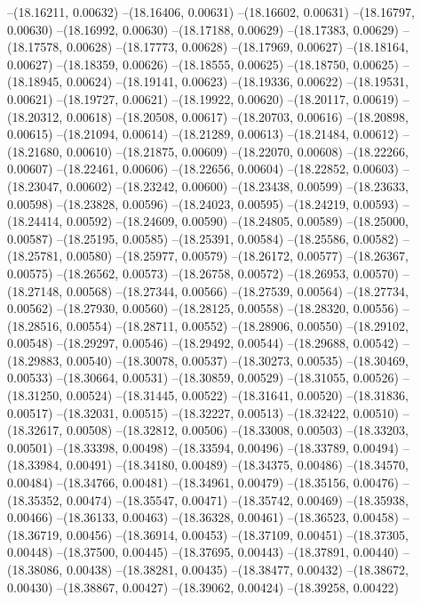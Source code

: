 --(18.16211, 0.00632)
--(18.16406, 0.00631)
--(18.16602, 0.00631)
--(18.16797, 0.00630)
--(18.16992, 0.00630)
--(18.17188, 0.00629)
--(18.17383, 0.00629)
--(18.17578, 0.00628)
--(18.17773, 0.00628)
--(18.17969, 0.00627)
--(18.18164, 0.00627)
--(18.18359, 0.00626)
--(18.18555, 0.00625)
--(18.18750, 0.00625)
--(18.18945, 0.00624)
--(18.19141, 0.00623)
--(18.19336, 0.00622)
--(18.19531, 0.00621)
--(18.19727, 0.00621)
--(18.19922, 0.00620)
--(18.20117, 0.00619)
--(18.20312, 0.00618)
--(18.20508, 0.00617)
--(18.20703, 0.00616)
--(18.20898, 0.00615)
--(18.21094, 0.00614)
--(18.21289, 0.00613)
--(18.21484, 0.00612)
--(18.21680, 0.00610)
--(18.21875, 0.00609)
--(18.22070, 0.00608)
--(18.22266, 0.00607)
--(18.22461, 0.00606)
--(18.22656, 0.00604)
--(18.22852, 0.00603)
--(18.23047, 0.00602)
--(18.23242, 0.00600)
--(18.23438, 0.00599)
--(18.23633, 0.00598)
--(18.23828, 0.00596)
--(18.24023, 0.00595)
--(18.24219, 0.00593)
--(18.24414, 0.00592)
--(18.24609, 0.00590)
--(18.24805, 0.00589)
--(18.25000, 0.00587)
--(18.25195, 0.00585)
--(18.25391, 0.00584)
--(18.25586, 0.00582)
--(18.25781, 0.00580)
--(18.25977, 0.00579)
--(18.26172, 0.00577)
--(18.26367, 0.00575)
--(18.26562, 0.00573)
--(18.26758, 0.00572)
--(18.26953, 0.00570)
--(18.27148, 0.00568)
--(18.27344, 0.00566)
--(18.27539, 0.00564)
--(18.27734, 0.00562)
--(18.27930, 0.00560)
--(18.28125, 0.00558)
--(18.28320, 0.00556)
--(18.28516, 0.00554)
--(18.28711, 0.00552)
--(18.28906, 0.00550)
--(18.29102, 0.00548)
--(18.29297, 0.00546)
--(18.29492, 0.00544)
--(18.29688, 0.00542)
--(18.29883, 0.00540)
--(18.30078, 0.00537)
--(18.30273, 0.00535)
--(18.30469, 0.00533)
--(18.30664, 0.00531)
--(18.30859, 0.00529)
--(18.31055, 0.00526)
--(18.31250, 0.00524)
--(18.31445, 0.00522)
--(18.31641, 0.00520)
--(18.31836, 0.00517)
--(18.32031, 0.00515)
--(18.32227, 0.00513)
--(18.32422, 0.00510)
--(18.32617, 0.00508)
--(18.32812, 0.00506)
--(18.33008, 0.00503)
--(18.33203, 0.00501)
--(18.33398, 0.00498)
--(18.33594, 0.00496)
--(18.33789, 0.00494)
--(18.33984, 0.00491)
--(18.34180, 0.00489)
--(18.34375, 0.00486)
--(18.34570, 0.00484)
--(18.34766, 0.00481)
--(18.34961, 0.00479)
--(18.35156, 0.00476)
--(18.35352, 0.00474)
--(18.35547, 0.00471)
--(18.35742, 0.00469)
--(18.35938, 0.00466)
--(18.36133, 0.00463)
--(18.36328, 0.00461)
--(18.36523, 0.00458)
--(18.36719, 0.00456)
--(18.36914, 0.00453)
--(18.37109, 0.00451)
--(18.37305, 0.00448)
--(18.37500, 0.00445)
--(18.37695, 0.00443)
--(18.37891, 0.00440)
--(18.38086, 0.00438)
--(18.38281, 0.00435)
--(18.38477, 0.00432)
--(18.38672, 0.00430)
--(18.38867, 0.00427)
--(18.39062, 0.00424)
--(18.39258, 0.00422)
